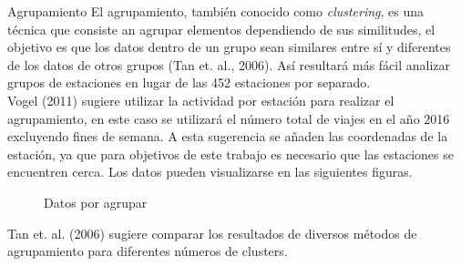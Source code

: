 \documentclass[12pt,spanish]{article}
\makeatletter
\newcounter{numberofruns}%
\newcommand{\secfig@@writecounterstage}{1}%
\newcommand{\secfig@@readcounterstage}{2}%
\newcommand{\secfig@@writecontentstage}{2}%
\newlength{\loftsectionbeforeskipamount}%
\newlength{\loftsectionafterskipamount}%
\newcommand{\loftsectionbeforeskip}{\vspace{\loftsectionbeforeskipamount}}%
\newcommand{\loftsectionafterskip}{\vspace{\loftsectionafterskipamount}}%
\newcounter{totalsections}
\let\LaTeXStandardSection\section%
\newcommand{\unstarredsection@@noopt}[1]{%
	\unstarredsection@@opt[#1]{#1}%
}%
\newcommand{\StoreCounterValue}[1]{%
	\immediate\expandafter\write\csname #1countsout\endcsname{%
		\number\value{#1}%
	}%
}%
\newcommand{\LoadAllStoredCounterValues}[1]{%
	\ifnumequal{\number\value{#1}}{\secfig@@readcounterstage}{%
		\read\figurecountsin to \lastsectionfigures
		\read\tablecountsin  to \lastsectiontables%
	}{}%
}%
\newcommand{\loftsectioncontentsline}[1]{%
	\loftsectionbeforeskip\textbf{\large\thesection~#1}\loftsectionafterskip
}%
\newcommand{\unstarredsection@@opt}[2][]{%
	\iftoggle{SectionsInLOFT}{%
		\FloatBarrier%
		\gdef\lastsectionfigures{0}%
		\gdef\lastsectiontables{0}%
		\ifnumequal{\number\value{numberofruns}}{\secfig@@writecounterstage}{%
			\gdef\lastsectionfigures{\number\value{figure}}%
			\gdef\lastsectionfigures{\number\value{table}}%
			\ifnumequal{\number\value{totalsections}}{0}{%
			}{%
				\StoreCounterValue{figure}%
				\StoreCounterValue{table}%
			}%
		}{%
			\LoadAllStoredCounterValues{numberofruns}%
		}%
	}{%
	}%
	\LaTeXStandardSection[#1]{#2}%
	\iftoggle{SectionsInLOFT}{%
		\ifnumequal{\number\value{numberofruns}}{\secfig@@writecontentstage}{%
			\ifnumgreater{\lastsectionfigures}{0}{%
				\typeout{Writing a section entry for \thesection{}to the LOF}%
				\iftoggle{AppendixSectionsInLOF}{%
					\addtocontents{lof}{\loftsectioncontentsline{#1}}%
				}{}%
			}{%
				\typeout{No figures in \thesection!}
			}%
			\ifnumgreater{\lastsectiontables}{0}{%
				\typeout{Writing a section entry for \thesection{}to the LOT}%
				\iftoggle{AppendixSectionsInLOT}{%
					\addtocontents{lot}{\loftsectioncontentsline{#1}}%
				}{}%
			}{%
				\typeout{No tables in \thesection!}
			}%
		}{}%
	}{%
	}%
}%
\newcommand{\unstarredsection}{%
	\@ifnextchar[{%
		\unstarredsection@@opt%
	}{%
		\unstarredsection@@noopt%
	}%
}%
\newcommand{\starredsection}[1]{%
	\LaTeXStandardSection*{#1}%
}%
\renewcommand{\section}{%
	\@ifstar{%
		\starredsection%
	}{%
		\unstarredsection%
	}%
}%
\makeatother
\begin{document}
	\section{Agrupamiento}
	El agrupamiento, también conocido como \textit{clustering}, es una técnica que consiste an agrupar elementos dependiendo de sus similitudes, el objetivo es que los datos dentro de un grupo sean similares entre sí y diferentes de los datos de otros grupos (Tan et. al., 2006).	Así resultará más fácil analizar grupos de estaciones en lugar de las 452 estaciones por separado.\\
	Vogel (2011) sugiere utilizar la actividad por estación para realizar el agrupamiento, en este caso se utilizará el número total de viajes en el año 2016 excluyendo fines de semana. A esta sugerencia se añaden las coordenadas de la estación, ya que para objetivos de este trabajo es necesario que las estaciones se encuentren cerca. Los datos pueden visualizarse en las siguientes figuras.\\
	\begin{figure}[H]%
		\centering
		\qquad
		\caption{Datos por agrupar}%
		\label{fig:example}%
	\end{figure}

	Tan et. al. (2006) sugiere comparar los resultados de diversos métodos de agrupamiento para diferentes números de clusters.
	
\end{document}
